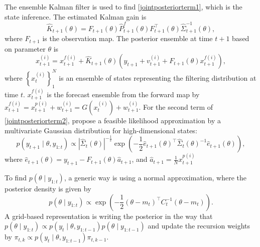 The ensemble Kalman filter is used to find \eqref{jointposteriorterm1}, which is the state inference. The estimated Kalman gain is 
\begin{equation*}
\hat{K}_{t+1}(\theta) = F_{t+1}(\theta)\hat{P}_{t+1}^f(\theta)F_{t+1}^\top(\theta) \hat{\Sigma}_{t+1}^{-1}(\theta),
\end{equation*}
where $F_{t+1}$ is the observation map. The posterior ensemble at time $t+1$ based on parameter $\theta$ is
\begin{equation}\label{ensembleKalmanForecast}
x_{t+1}^{(i)} = x_{t+1}^{f(i)}+\hat{K}_{t+1}(\theta)\left(y_{t+1}+v_{t+1}^{(i)}+F_{t+1}(\theta)x_{t+1}^{f(i)}\right), 
\end{equation}
where $\left\lbrace x_{t}^{(i)}\right\rbrace_1^N$ is an ensemble of states representing the filtering distribution at time $t$. $x_{t+1}^{f(i)}$ is the forecast ensemble from the forward map by $x_{t+1}^{f(i)} = x_{t+1}^{p(i)} +w_{t+1}^{(i)}= G\left(x_{t}^{(i)}\right)+w_{t+1}^{(i)}$. For the second term of  \eqref{jointposteriorterm2},  \cite{stroud2016bayesian} propose a feasible likelihood approximation by a multivariate Gaussian distribution \citep{mitchell2000adaptive} for high-dimensional states: 
\begin{equation}\label{esembleKalmanLikeli}
p(y_{t+1}\mid\theta,y_{1:t})\propto \left| \hat{\Sigma}_t(\theta)  \right|^{-\frac{1}{2}} \exp \left( -\frac{1}{2} \hat{e}_{t+1}(\theta)^\top \hat{\Sigma}_t(\theta)^{-1} \hat{e}_{t+1}(\theta) \right),
\end{equation}
where $\hat{e}_{t+1}(\theta) = y_{t+1}-F_{t+1}(\theta)\hat{a}_{t+1}$, and $\hat{a}_{t+1}=\frac{1}{N}x_{t+1}^{p(i)}$

To find $p(\theta\mid y_{1:t})$, a generic way is using a normal approximation, where the posterior density  is given by 
\begin{equation*}
p(\theta\mid y_{1:t}) \propto \exp \left(  -\frac{1}{2}(\theta-m_t)^\top C_t^{-1}(\theta-m_t) \right).
\end{equation*}
A grid-based representation is writing the posterior in the way that $p(\theta\mid y_{1:t}) \propto p(y_t\mid\theta,y_{1:t-1})p(\theta\mid y_{1:t-1})$ and update the recursion weights by $\pi_{t,k}\propto p(y_{t}\mid\theta,y_{1:t-1})\pi_{t,k-1}$. 

